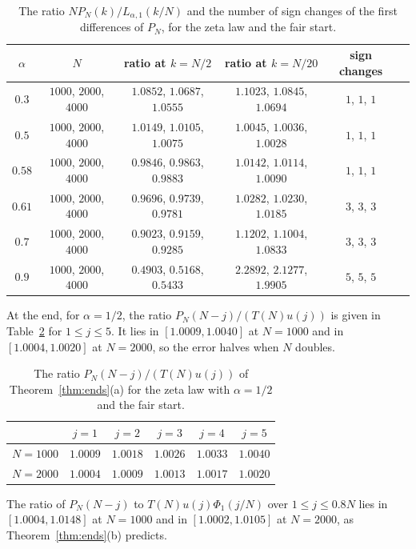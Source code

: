 \begin{table}[t]
\centering
\begin{tabular}{@{}cccccc@{}}
\toprule
$\alpha$ & $N$ & ratio at $k=N/2$ & ratio at $k=N/20$ & sign changes \\
\midrule
$0.3$ & $1000$, $2000$, $4000$ & $1.0852$, $1.0687$, $1.0555$ & $1.1023$, $1.0845$, $1.0694$ & $1$, $1$, $1$\\
$0.5$ & $1000$, $2000$, $4000$ & $1.0149$, $1.0105$, $1.0075$ & $1.0045$, $1.0036$, $1.0028$ & $1$, $1$, $1$\\
$0.58$ & $1000$, $2000$, $4000$ & $0.9846$, $0.9863$, $0.9883$ & $1.0142$, $1.0114$, $1.0090$ & $1$, $1$, $1$\\
$0.61$ & $1000$, $2000$, $4000$ & $0.9696$, $0.9739$, $0.9781$ & $1.0282$, $1.0230$, $1.0185$ & $3$, $3$, $3$\\
$0.7$ & $1000$, $2000$, $4000$ & $0.9023$, $0.9159$, $0.9285$ & $1.1202$, $1.1004$, $1.0833$ & $3$, $3$, $3$\\
$0.9$ & $1000$, $2000$, $4000$ & $0.4903$, $0.5168$, $0.5433$ & $2.2892$, $2.1277$, $1.9905$ & $5$, $5$, $5$\\
\bottomrule
\end{tabular}
\caption{The ratio $NP_N(k)/L_{\alpha,1}(k/N)$ and the number of sign changes of the first
differences of $P_N$, for the zeta law and the fair start.}
\label{tab:ratios}
\end{table}

At the end, for $\alpha=1/2$, the ratio $P_N(N-j)/(T(N)u(j))$ is given in
Table~\ref{tab:ends} for $1\le j\le5$. It lies in $[1.0009,1.0040]$ at $N=1000$ and in
$[1.0004,1.0020]$ at $N=2000$, so the error halves when $N$ doubles.

\begin{table}[t]
\centering
\begin{tabular}{@{}lccccc@{}}
\toprule
& $j=1$ & $j=2$ & $j=3$ & $j=4$ & $j=5$\\
\midrule
$N=1000$ & $1.0009$ & $1.0018$ & $1.0026$ & $1.0033$ & $1.0040$\\
$N=2000$ & $1.0004$ & $1.0009$ & $1.0013$ & $1.0017$ & $1.0020$\\
\bottomrule
\end{tabular}
\caption{The ratio $P_N(N-j)/(T(N)u(j))$ of Theorem~\ref{thm:ends}(a) for the zeta law with
$\alpha=1/2$ and the fair start.}
\label{tab:ends}
\end{table} The ratio of $P_N(N-j)$ to $T(N)u(j)\Phi_1(j/N)$ over $1\le j\le0.8N$ lies
in $[1.0004,1.0148]$ at $N=1000$ and in $[1.0002,1.0105]$ at $N=2000$, as
Theorem~\ref{thm:ends}(b) predicts.

